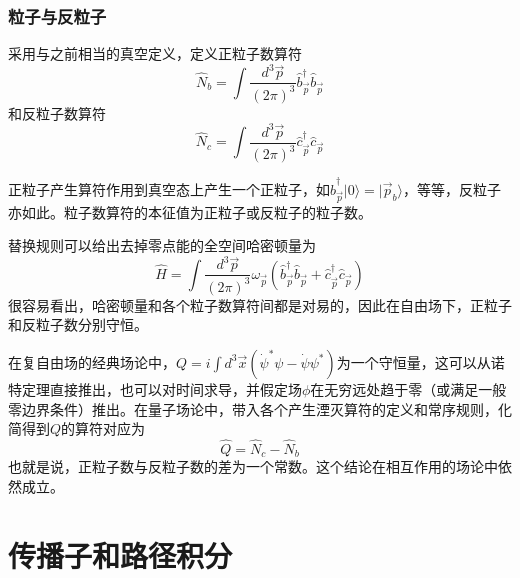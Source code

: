 \documentclass[a4paper,11pt]{ctexart}
\newcommand{\beq}{\begin{equation}}
\newcommand{\eeq}{\end{equation}}
\begin{document}
\subsubsection{粒子与反粒子}
采用与之前相当的真空定义，定义正粒子数算符
\beq
\hat{N}_b = \int \frac{d^3 \vec{p}}{(2\pi)^3}   \hat{b}_{\vec{p}}^\dagger \hat{b}_{\vec{p}}
\eeq
和反粒子数算符
\beq
\hat{N}_c = \int \frac{d^3 \vec{p}}{(2\pi)^3} \hat{c}_{\vec{p}}^\dagger \hat{c}_{\vec{p}}
\eeq
\par
正粒子产生算符作用到真空态上产生一个正粒子，如$\hat{b}_{\vec{p}}^\dagger |0\rangle = |\vec{p}_b \rangle$，等等，反粒子亦如此。粒子数算符的本征值为正粒子或反粒子的粒子数。
\par
替换规则可以给出去掉零点能的全空间哈密顿量为
\beq \label{complexham}
\hat{H} = \int \frac{d^3 \vec{p}}{(2\pi)^3} \omega_{\vec{p}} (\hat{b}_{\vec{p}}^\dagger \hat{b}_{\vec{p}} +\hat{c}_{\vec{p}}^\dagger \hat{c}_{\vec{p}})
\eeq
很容易看出，哈密顿量和各个粒子数算符间都是对易的，因此在自由场下，正粒子和反粒子数分别守恒。
\par
在复自由场的经典场论中，$Q = i \int d^3 \vec{x} (\dot{\psi}^* \psi - \dot{\psi} \psi^*)$为一个守恒量，这可以从诺特定理直接推出，也可以对时间求导，并假定场$\phi$在无穷远处趋于零（或满足一般零边界条件）推出。在量子场论中，带入各个产生湮灭算符的定义和常序规则，化简得到$Q$的算符对应为
\beq
\hat{Q} = \hat{N}_c - \hat{N}_b
\eeq
也就是说，正粒子数与反粒子数的差为一个常数。这个结论在相互作用的场论中依然成立。

\section{传播子和路径积分}
\end{document}
